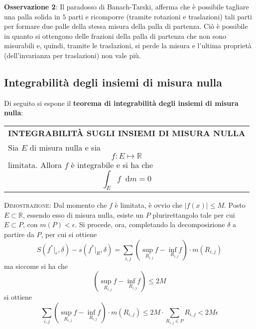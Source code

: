 \documentclass[a4paper]{extarticle}
\renewcommand\arraystretch{}
\newcommand*\dif{\mathop{}\!\mathrm{d}}
\begin{document}
\vspace{2em}
\noindent
\textbf{Osservazione 2}: Il paradosso di Banach-Tarski, afferma che è possibile tagliare una palla solida in $5$ parti e ricomporre (tramite rotazioni e traslazioni) tali parti per formare due palle della stessa misura della palla di partenza. Ciò è possibile in quanto si ottengono delle frazioni della palla di partenza che non sono misurabili e, quindi, tramite le traslazioni, si perde la misura e l'ultima proprietà (dell'invarianza per traslazioni) non vale più.

\vspace{1em}
\noindent
\subsection{Integrabilità degli insiemi di misura nulla}
Di seguito si espone il \textbf{teorema di integrabilità degli insiemi di misura nulla}:

\vspace{1em}
\setlength{\tabcolsep}{14pt}
\renewcommand{\arraystretch}{2}
\noindent
\begin{tabularx}{\textwidth}{@{}|P|@{}}
    \hline
    {\textbf{INTEGRABILITÀ SUGLI INSIEMI DI MISURA NULLA}}\\
    \parbox{\linewidth}{Sia $E$ di misura nulla e sia
    \[f : E \longmapsto \mathbb{R}\]
    limitata. Allora $f$ è integrabile e si ha che
    \[\int_E f \dif m = 0\]
    \vspace{-3mm}}\\
    \hline
\end{tabularx}

\vspace{2em}
\noindent
\normalfont \normalsize
\textsc{Dimostrazione}: Dal momento che $f$ è limitata, è ovvio che $\vert f(x) \vert \leq M$. Posto $E \subset \mathbb{R}$, essendo esso di misura nulla, esiste un $P$ plurirettangolo tale per cui $E \subset P$, con $m(P) < \epsilon$. Si procede, ora, completando la decomposizione $\delta$ a partire da $P$, per cui si ottiene
\[S(f^* \vert_r, \delta) - s(f^*\vert_R,\delta) = \sum_{i,j} \left(\underset{R_{i,j}}{\sup f} - \underset{R_{i,j}}{\inf f}\right) \cdot m(R_{i,j})\]
ma siccome si ha che
\[\left(\underset{R_{i,j}}{\sup f} - \underset{R_{i,j}}{\inf f}\right) \leq 2M\]
si ottiene
\[\sum_{i,j} \left(\underset{R_{i,j}}{\sup f} - \underset{R_{i,j}}{\inf f}\right) \cdot m(R_{i,j}) \leq 2M \cdot \sum_{R_{i,j} \in P} R_{i,j} < 2M \epsilon\]
\end{document}
